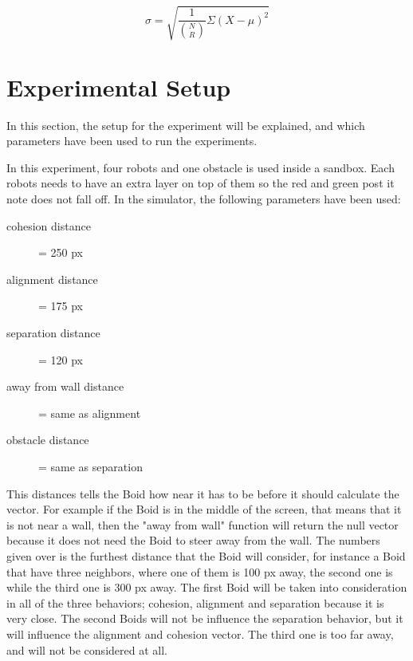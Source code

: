 \begin{equation}
\label{eq:sd2}
\sigma =  \sqrt{\frac{1}{{N \choose R}}\Sigma(X-\mu)^2}
\end{equation}


\section{Experimental Setup}
\label{sec:experimentalSetup}
In this section, the setup for the experiment will be explained, and which parameters have been used to run the experiments.

In this experiment, four robots and one obstacle is used inside a sandbox. Each robots needs to have an extra layer on top of them so the red and green post it note does not fall off.
In the simulator, the following parameters have been used:
\begin{description}
\item[cohesion distance] = 250 px
\item[alignment distance] = 175 px
\item[separation distance] = 120 px
\item[away from wall distance] = same as alignment
\item[obstacle distance] = same as separation
\end{description}
This distances tells the Boid how near it has to be before it should calculate the vector. For example if the Boid is in the middle of the screen, that means that it is not near a wall, then the "away from wall" function will return the null vector because it does not need the Boid to steer away from the wall.
The numbers given over is the furthest distance that the Boid will consider, for instance a Boid that have three neighbors, where one of them is 100 px away, the second one is  while the third one is 300 px away. The first Boid will be taken into consideration in all of the three behaviors; cohesion, alignment and separation because it is very close. The second Boids will not be influence the separation behavior, but it will influence the alignment and cohesion vector. The third one is too far away, and will not be considered at all.

